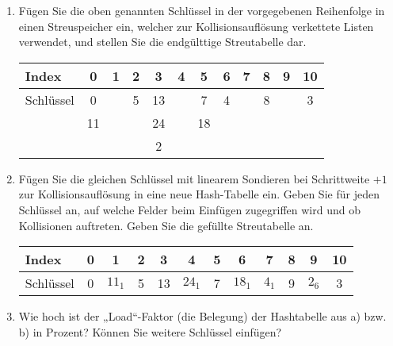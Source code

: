 \documentclass{lehramt-informatik-aufgabe}
\begin{document}
\begin{enumerate}


\item Fügen Sie die oben genannten Schlüssel in der vorgegebenen
Reihenfolge in einen Streuspeicher ein, welcher zur Kollisionsauflösung
verkettete Listen verwendet, und stellen Sie die endgülttige
Streutabelle dar.

\begin{antwort}
\begin{center}
\begin{tabular}{l|ccccccccccc}
Index     & 0  & 1 & 2 & 3  & 4 & 5  & 6 & 7 & 8 & 9 & 10\\\hline
Schlüssel & 0  &   & 5 & 13 &   & 7  & 4 &   & 8 &   & 3 \\
          & 11 &   &   & 24 &   & 18 &   &   &   &   &  \\
          &    &   &   & 2  &   &    &   &   &   &   &  \\
\end{tabular}
\end{center}
\end{antwort}


\item Fügen Sie die gleichen Schlüssel mit linearem Sondieren bei
Schrittweite $+1$ zur Kollisionsauflösung in eine neue Hash-Tabelle ein.
Geben Sie für jeden Schlüssel an, auf welche Felder beim Einfügen
zugegriffen wird und ob Kollisionen auftreten. Geben Sie die gefüllte
Streutabelle an.

\begin{antwort}
\begin{center}
\begin{tabular}{l|ccccccccccc}
Index     & 0  & 1      & 2 & 3  & 4       & 5  & 6      & 7      & 8 & 9      & 10\\\hline
Schlüssel & 0  & $11_1$ & 5 & 13 & $24_1$  & 7  & $18_1$ & $4_1$  & 9 & $2_6$  & 3 \\
\end{tabular}
\end{center}
\end{antwort}


\item Wie hoch ist der „Load“-Faktor (die Belegung) der Hashtabelle aus
a) bzw. b) in Prozent? Können Sie weitere Schlüssel einfügen?

\begin{antwort}


\end{antwort}
\end{enumerate}
\end{document}
